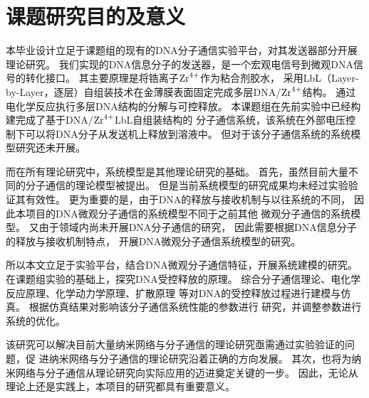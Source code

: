 \section{课题研究目的及意义}
本毕业设计立足于课题组的现有的DNA分子通信实验平台，对其发送器部分开展理论研究。
我们实现的DNA信息分子的发送器，是一个宏观电信号到微观DNA信号的转化接口。
其主要原理是将锆离子$\ce{Zr^4+}$作为粘合剂胶水，
采用LbL（Layer-by-Layer，逐层）自组装技术在金薄膜表面固定完成多层DNA/$\ce{Zr^4+}$结构。
通过电化学反应执行多层DNA结构的分解与可控释放。
本课题组在先前实验中已经构建完成了基于DNA/$\ce{Zr^{4+}}$LbL自组装结构的
分子通信系统，该系统在外部电压控制下可以将DNA分子从发送机上释放到溶液中。
但对于该分子通信系统的系统模型研究还未开展。

而在所有理论研究中，系统模型是其他理论研究的基础。
首先，虽然目前大量不同的分子通信的理论模型被提出。
但是当前系统模型的研究成果均未经过实验验证其有效性。
更为重要的是，由于DNA的释放与接收机制与以往系统的不同，
因此本项目的DNA微观分子通信的系统模型不同于之前其他
微观分子通信的系统模型。
又由于领域内尚未开展DNA分子通信的研究，
因此需要根据DNA信息分子的释放与接收机制特点，
开展DNA微观分子通信系统模型的研究。

所以本文立足于实验平台，结合DNA微观分子通信特征，开展系统建模的研究。
在课题组实验的基础上，探究DNA受控释放的原理。
综合分子通信理论、电化学反应原理、化学动力学原理、扩散原理
等对DNA的受控释放过程进行建模与仿真。
根据仿真结果对影响该分子通信系统性能的参数进行
研究，并调整参数进行系统的优化。

该研究可以解决目前大量纳米网络与分子通信的理论研究亟需通过实验验证的问题，促
进纳米网络与分子通信的理论研究沿着正确的方向发展。
其次，也将为纳米网络与分子通信从理论研究向实际应用的迈进奠定关键的一步。
因此，无论从理论上还是实践上，本项目的研究都具有重要意义。